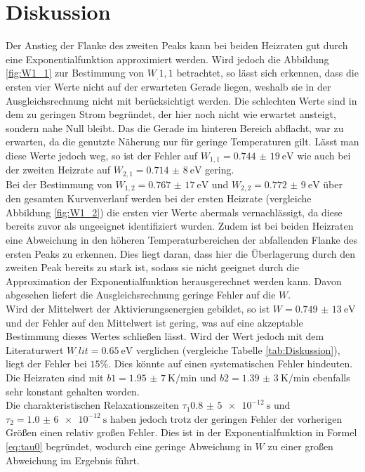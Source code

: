 
\section{Diskussion}
\label{sec:Diskussion}

Der Anstieg der Flanke des zweiten Peaks kann bei beiden Heizraten gut durch eine Exponentialfunktion approximiert werden. Wird jedoch die Abbildung \ref{fig:W1_1} zur Bestimmung von $W_.{1,1}$ betrachtet, so lässt sich erkennen, dass die ersten vier Werte nicht auf der erwarteten Gerade liegen, weshalb sie in der Ausgleichsrechnung nicht mit berücksichtigt werden. Die schlechten Werte sind in dem zu geringen Strom begründet, der hier noch nicht wie erwartet ansteigt, sondern nahe Null bleibt. Das die Gerade im hinteren Bereich abflacht, war zu erwarten, da die genutzte Näherung nur für geringe Temperaturen gilt. Lässt man diese Werte jedoch weg, so ist der Fehler auf $W_{1,1}=\SI{0,744(19)}{\electronvolt}$ wie auch bei der zweiten Heizrate auf $W_{2,1}=\SI{0,714(8)}{\electronvolt}$ gering.\\
Bei der Bestimmung von $W_{1,2}=\SI{0,767(17)}{\electronvolt}$ und $W_{2,2}=\SI{0,772(9)}{\electronvolt}$ über den gesamten Kurvenverlauf werden bei der ersten Heizrate (vergleiche Abbildung \ref{fig:W1_2}) die ersten vier Werte abermals vernachlässigt, da diese bereits zuvor als ungeeignet identifiziert wurden. Zudem ist bei beiden Heizraten eine Abweichung in den höheren Temperaturbereichen der abfallenden Flanke des ersten Peaks zu erkennen. Dies liegt daran, dass hier die Überlagerung durch den zweiten Peak bereits zu stark ist, sodass sie nicht geeignet durch die Approximation der Exponentialfunktion herausgerechnet werden kann. Davon abgesehen liefert die Ausgleichsrechnung geringe Fehler auf die $W$.\\
Wird der Mittelwert der Aktivierungsenergien gebildet, so ist $W=\SI{0,749(13)}{\electronvolt}$ und der Fehler auf den Mittelwert ist gering, was auf eine akzeptable Bestimmung dieses Wertes schließen lässt. Wird der Wert jedoch mit dem Literaturwert $W_.{lit}=\SI{0,65}{\eV}$ \cite{DipolW} verglichen (vergleiche Tabelle \ref{tab:Diskussion}), liegt der Fehler bei $15\%$. Dies könnte auf einen systematischen Fehler hindeuten. Die Heizraten sind mit $b1=\SI{1,95(7)}{\kelvin\per\minute}$ und $b2=\SI{1,39(3)}{\kelvin\per\minute}$ ebenfalls sehr konstant gehalten worden.\\
Die charakteristischen Relaxationszeiten $\tau_1\SI{0,8(5)e-12}{\second}$ und $\tau_2=\SI{1,0(6)e-12}{\second}$ haben jedoch trotz der geringen Fehler der vorherigen Größen einen relativ großen Fehler. Dies ist in der Exponentialfunktion in Formel \eqref{eq:tau0} begründet, wodurch eine geringe Abweichung in $W$ zu einer großen Abweichung im Ergebnis führt.
